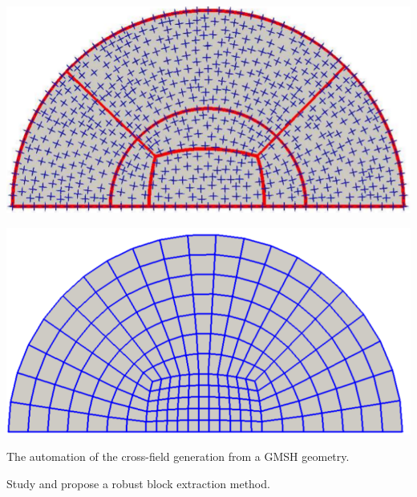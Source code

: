 \documentclass[a0paper,portrait, fontscale=0.30]{baposter}
\begin{document}
\begin{poster}
{\begin{minipage}[b]{0.13\linewidth}
\label{fig:figure2}
\end{minipage}
\begin{minipage}[b]{0.13\linewidth}
\includegraphics[width=0.99\linewidth]{3}
\label{fig:figure3}
\end{minipage}
\begin{minipage}[b]{0.13\linewidth}
\includegraphics[width=0.99\linewidth]{4}
\label{fig:figure4}
\end{minipage}
\begin{minipage}[b]{0.46\linewidth}
The automation of the cross-field generation from a GMSH geometry.

Study and propose a robust block extraction method. 


\end{minipage}}
\end{poster}
\end{document}
